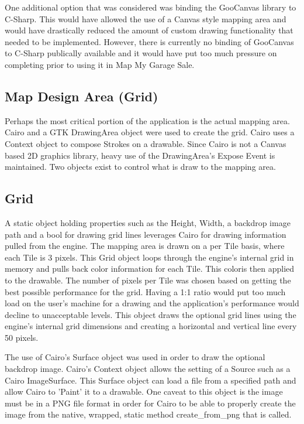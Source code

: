 \documentclass{report}
\begin{document}
One additional option that was considered was binding the GooCanvas library to C-Sharp.
This would have allowed the use of a Canvas style mapping area and would have 
drastically reduced the amount of custom drawing functionality that needed to be 
implemented. However, there is currently no binding of GooCanvas to C-Sharp publically 
available and it would have put too much pressure on completing prior to using it in 
Map My Garage Sale.

\subsection{Map Design Area (Grid)}
Perhaps the most critical portion of the application is the actual mapping area. Cairo
and a GTK DrawingArea object were used to create the grid. Cairo uses a Context object 
to compose Strokes on a drawable. Since Cairo is not a Canvas based 2D graphics library, 
heavy use of the DrawingArea's Expose Event is maintained. 
Two objects exist to control what is draw to the mapping area. 

\subsection{Grid}
A static object holding properties such as the Height, Width, a backdrop image path and a bool 
for drawing grid lines leverages Cairo for drawing information pulled from the engine. The 
mapping area is drawn on a per Tile basis, where each Tile is 3 pixels. This Grid object loops 
through the engine's internal grid in memory and pulls back color information for each Tile. This 
coloris then applied to the drawable. The number of pixels per Tile was chosen based on getting the 
best possible performance for the grid. Having a 1:1 ratio would put too much load on the user's
machine for a drawing and the application's performance would decline to unacceptable levels.
This object draws the optional grid lines using the engine's internal grid dimensions and
creating a horizontal and vertical line every 50 pixels.

The use of Cairo's Surface object was used in order to draw the optional backdrop image. 
Cairo's Context object allows the setting of a Source such as a Cairo ImageSurface. 
This Surface object can load a file from a specified path and allow Cairo to 'Paint' it to 
a drawable. One caveat to this object is the image must be in a PNG file format in
order for Cairo to be able to properly create the image from the native, wrapped,
static method create_from_png that is called.
\end{document}
